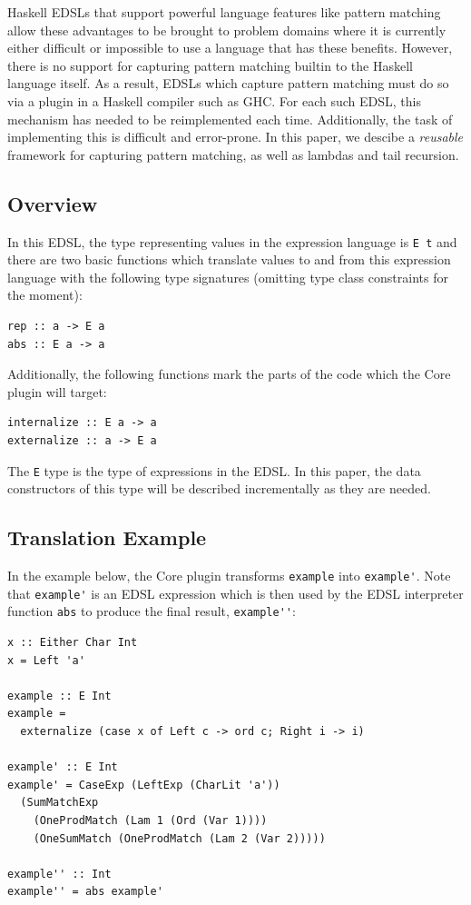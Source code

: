 \documentclass[runningheads, a4paper]{llncs}
\newcommand{\ttt}{\texttt}
\begin{document}
Haskell EDSLs that support powerful language features like pattern matching
allow these advantages to be brought to problem domains where it is currently
either difficult or impossible to use a language that has these benefits.
However, there is no support for capturing pattern matching builtin to the Haskell
language itself. As a result, EDSLs which capture pattern matching must do so
via a plugin in a Haskell compiler such as GHC. For each such EDSL, this mechanism
has needed to be reimplemented each time. Additionally, the task of implementing this
is difficult and error-prone. In this paper, we descibe a \textit{reusable}
framework for capturing pattern matching, as well as lambdas and tail recursion.

\subsection{Overview}
\label{sec:Overview}

In this EDSL, the type representing values in the expression language is \ttt{E
t} and there are two basic functions which translate values to and from this
expression language with the following type signatures (omitting type class
constraints for the moment):

\begin{lstlisting}
rep :: a -> E a
abs :: E a -> a
\end{lstlisting}

\noindent Additionally, the following functions mark the parts of the code which the Core
plugin will target:

\begin{lstlisting}
internalize :: E a -> a
externalize :: a -> E a
\end{lstlisting}

\noindent The \ttt{E} type is the type of expressions in the EDSL.  In this paper, the
data constructors of this type will be described incrementally as they
are needed.

\subsection{Translation Example}

In the example below, the Core plugin transforms \verb|example| into
\verb|example'|. Note that \verb|example'| is an EDSL expression which is then
used by the EDSL interpreter function \verb|abs| to produce the final result,
\verb|example''|:

\begin{lstlisting}[deletekeywords={Ord}]
x :: Either Char Int
x = Left 'a'

example :: E Int
example =
  externalize (case x of Left c -> ord c; Right i -> i)

example' :: E Int
example' = CaseExp (LeftExp (CharLit 'a'))
  (SumMatchExp
    (OneProdMatch (Lam 1 (Ord (Var 1))))
    (OneSumMatch (OneProdMatch (Lam 2 (Var 2)))))

example'' :: Int
example'' = abs example'
\end{lstlisting}
\end{document}
